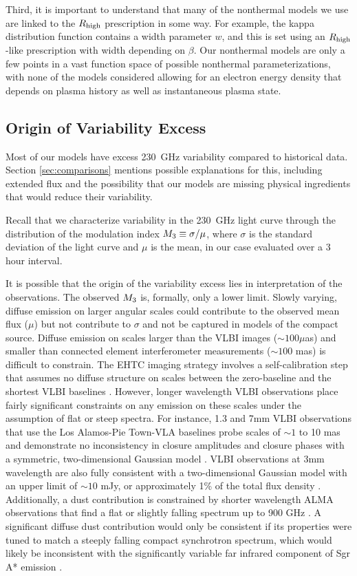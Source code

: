 Third, it is important to understand that many of the nonthermal models we use are linked to the $R_\mathrm{high}$ prescription in some way.  For example, the kappa distribution function contains a width parameter $w$, and this is set using an $R_\mathrm{high}$-like prescription with width depending on $\beta$.  Our nonthermal models are only a few points in a vast function space of possible nonthermal parameterizations, with none of the models considered allowing for an electron energy density that depends on plasma history as well as instantaneous plasma state.  

\subsection{Origin of Variability Excess}

Most of our models have excess 230~GHz variability compared to historical data.
Section \ref{sec:comparisons} mentions possible explanations for this, including extended flux and the possibility that our models are missing physical ingredients that would reduce their variability.  

Recall that we characterize variability in the 230~GHz light curve through the distribution of the modulation index $M_{3} \equiv \sigma/\mu$, where $\sigma$ is the standard deviation of the light curve and $\mu$ is the mean, in our case evaluated over a 3 hour interval.

It is possible that the origin of the variability excess lies in interpretation of the observations. 
The observed $M_{3}$ is, formally, only a lower limit.  Slowly varying, diffuse emission on larger angular scales could contribute to the observed mean flux ($\mu$) but not contribute to $\sigma$ and not be captured in models of the compact source.  Diffuse emission on scales larger than the VLBI images ($\sim 100 \mu$as) and smaller than connected element interferometer measurements ($\sim 100$ mas) is difficult to constrain.  The EHTC imaging strategy involves a self-calibration step that assumes no diffuse structure on scales between the zero-baseline and the shortest VLBI baselines .  However, longer wavelength VLBI observations place fairly significant constraints on any emission on these scales under the assumption of flat or steep spectra.  For instance, 1.3 and 7mm VLBI observations that use the Los Alamos-Pie Town-VLA baselines probe scales of $\sim 1$ to 10 mas and demonstrate no inconsistency in closure amplitudes and closure phases with a symmetric, two-dimensional Gaussian model \citep{2004Sci...304..704B}.  VLBI observations at 3mm wavelength are also fully consistent with a two-dimensional Gaussian model with an upper limit of $\sim 10$ mJy, or approximately 1\% of the total flux density \citep{2019A&A...621A.119B}. Additionally, a dust contribution is constrained by shorter wavelength ALMA observations that find a flat or slightly falling spectrum up to 900 GHz \citep{2019ApJ...881L...2B}.  A significant diffuse dust contribution would only be consistent if its properties were tuned to match a steeply falling compact synchrotron spectrum, which would likely be inconsistent with the significantly variable far infrared component of Sgr A* emission \citep{2016ApJ...825...32S, 2018ApJ...862..129V}.

